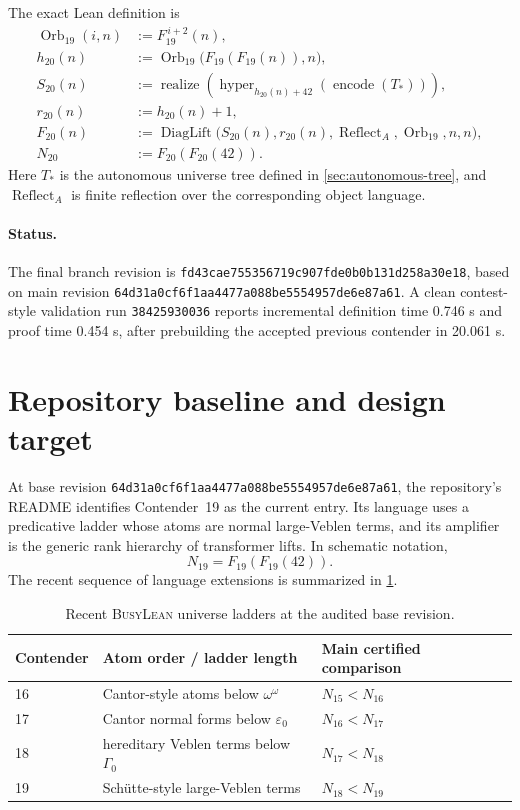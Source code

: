\documentclass[11pt]{article}
\theoremstyle{definition}
\theoremstyle{remark}
\newcommand{\BusyLean}{\textsc{BusyLean}}
\newcommand{\Orb}{\operatorname{Orb}_{19}}
\newcommand{\reflectA}{\operatorname{Reflect}_{A}}
\newcommand{\diagLift}{\operatorname{DiagLift}}
\newcommand{\FinalCommit}{\texttt{fd43cae755356719c907fde0b0b131d258a30e18}}
\newcommand{\BaseCommit}{\texttt{64d31a0cf6f1aa4477a088be5554957de6e87a61}}
\newcommand{\DefinitionTime}{0.746 s}
\newcommand{\ProofTime}{0.454 s}
\newcommand{\PreviousTime}{20.061 s}
\newcommand{\WorkflowRun}{\texttt{38425930036}}
\begin{document}
The exact Lean definition is
\begin{align*}
  \Orb(i,n) &:= F_{19}^{\,i+2}(n),\\
  h_{20}(n) &:= \Orb\bigl(F_{19}(F_{19}(n)),n\bigr),\\
  S_{20}(n) &:= \operatorname{realize}\!\left(
      \operatorname{hyper}_{h_{20}(n)+42}
      (\operatorname{encode}(T_{\!*}))\right),\\
  r_{20}(n) &:= h_{20}(n)+1,\\
  F_{20}(n) &:= \diagLift\bigl(S_{20}(n),r_{20}(n),
      \reflectA,\Orb,n,n\bigr),\\
  N_{20} &:= F_{20}(F_{20}(42)).
\end{align*}
Here $T_{\!*}$ is the autonomous universe tree defined in
\cref{sec:autonomous-tree}, and $\reflectA$ is finite reflection over the
corresponding object language.

\paragraph{Status.}
The final branch revision is \FinalCommit{}, based on main revision
\BaseCommit{}.  A clean contest-style validation run \WorkflowRun{} reports
incremental definition time \DefinitionTime{} and proof time \ProofTime{},
after prebuilding the accepted previous contender in \PreviousTime{}.

\section{Repository baseline and design target}
\label{sec:baseline}

At base revision \BaseCommit{}, the repository's README identifies
Contender~19 as the current entry.  Its language uses a predicative ladder
whose atoms are normal large-Veblen terms, and its amplifier is the generic
rank hierarchy of transformer lifts.  In schematic notation,
\[
  N_{19}=F_{19}(F_{19}(42)).
\]
The recent sequence of language extensions is summarized in
\cref{tab:baseline}.

\begin{table}[ht]
\centering
\caption{Recent \BusyLean{} universe ladders at the audited base revision.}
\label{tab:baseline}
\begin{tabular}{@{}lll@{}}
\toprule
Contender & Atom order / ladder length & Main certified comparison \\
\midrule
16 & Cantor-style atoms below $\omega^\omega$ & $N_{15}<N_{16}$ \\
17 & Cantor normal forms below $\varepsilon_0$ & $N_{16}<N_{17}$ \\
18 & hereditary Veblen terms below $\Gamma_0$ & $N_{17}<N_{18}$ \\
19 & Sch\"utte-style large-Veblen terms & $N_{18}<N_{19}$ \\
\bottomrule
\end{tabular}
\end{table}
\end{document}
